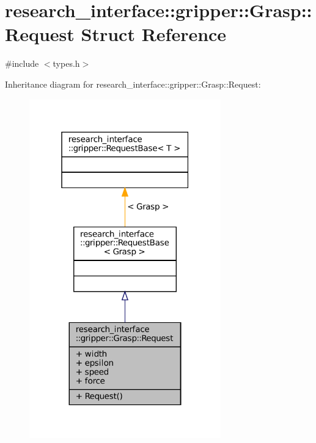\hypertarget{structresearch__interface_1_1gripper_1_1Grasp_1_1Request}{}\section{research\+\_\+interface\+:\+:gripper\+:\+:Grasp\+:\+:Request Struct Reference}
\label{structresearch__interface_1_1gripper_1_1Grasp_1_1Request}


{\ttfamily \#include $<$types.\+h$>$}



Inheritance diagram for research\+\_\+interface\+:\+:gripper\+:\+:Grasp\+:\+:Request\+:
\nopagebreak
\begin{figure}[H]
\begin{center}
\leavevmode
\includegraphics[width=235pt]{structresearch__interface_1_1gripper_1_1Grasp_1_1Request__inherit__graph}
\end{center}
\end{figure}


